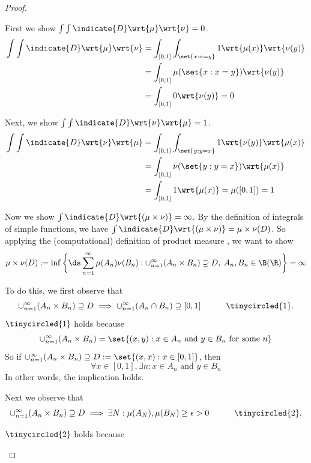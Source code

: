 \documentclass{article} %
\begin{document}
\begin{proof}

\begin{alphabate}
\item First we show $\int \int \indicate{D} \wrt{\mu} \wrt{\nu} = 0$.
%
\begin{align*}
\int \int \indicate{D} \wrt{\mu} \wrt{\nu} 
& = \int_{[0,1]} \int_{\set{x: x=y}} 1 \wrt{\mu(x)} \wrt{\nu(y)} \\
& = \int_{[0,1]} \mu(\set{x: x=y}) \wrt{\nu(y)} \\
&= \int_{[0,1]} 0 \wrt{\nu(y)} = 0
\end{align*}
\item Next, we show $\int \int \indicate{D} \wrt{\nu} \wrt{\mu}  = 1$.
%
\begin{align*}
\int \int \indicate{D}  \wrt{\nu} \wrt{\mu} 
& = \int_{[0,1]} \int_{\set{y: y=x}} 1  \wrt{\nu(y)} \wrt{\mu(x)} \\
& = \int_{[0,1]} \nu(\set{y: y=x}) \wrt{\mu(x)} \\
&= \int_{[0,1]} 1 \wrt{\mu(x)} = \mu([0,1]) = 1
\end{align*}

\item Now we show $\int \indicate{D} \wrt{(\mu \times \nu)} = \infty$. By the definition of integrals of simple functions, we have $\int \indicate{D} \wrt{(\mu \times \nu)} = \mu \times \nu(D)$.  So applying the (computational) definition of product measure , we want to show 
\begin{align}
\mu \times \nu(D): = \inf \bigg\{ \ds\sum_{n=1}^\infty \mu(A_n) \nu(B_n) : \cup_{n=1}^\infty (A_n \times B_n) \supseteq D, \; A_n, B_n \in \B(\R)\bigg\} = \infty 
\label{eqn:lesbegue_counting_product_measure_of_diagonal_of_unit_square_is_infinity}
\end{align}


To do this, we first observe that
\[\cup_{n=1}^\infty (A_n \times B_n) \supseteq D \implies \cup_{n=1}^\infty (A_n \cap B_n) \supseteq [0,1] \quad \quad \quad \tinycircled{1}. \]
%
{\tiny $\tinycircled{1}$ holds because
\[\cup_{n=1}^\infty (A_n \times B_n) = \set{(x,y) : x \in A_n \text{ and } y \in B_n \text{ for some } n } \] 
So if $\cup_{n=1}^\infty (A_n \times B_n) \supseteq D:=\set{(x,x) : x \in [0,1]}$, then 
\[ \forall x \in [0,1], \exists n : x \in A_n \text{ and } y \in B_n \]
In other words, the implication holds. }

Next we observe that
\[\cup_{n=1}^\infty (A_n \times B_n) \supseteq D \implies \exists N : \mu(A_N), \mu(B_N) \geq \epsilon > 0 \quad \quad \quad \tinycircled{2}. \]
%
{\tiny $\tinycircled{2}$ holds because

}
\end{alphabate}
\end{proof}
\end{document}
